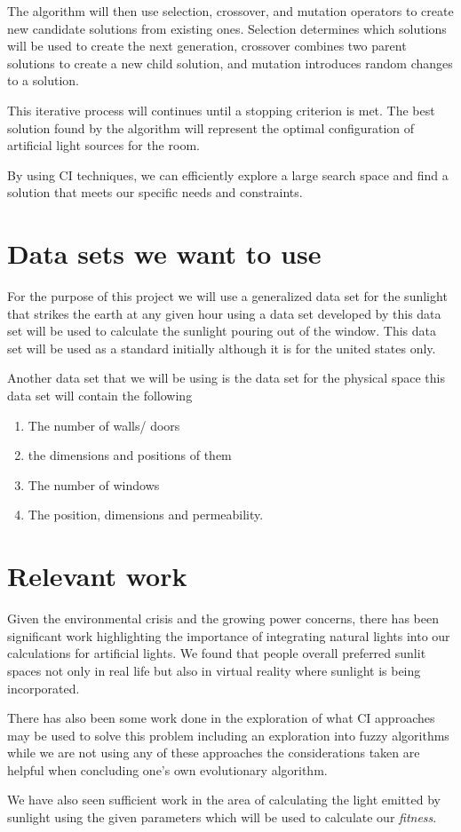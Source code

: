 \documentclass{article}
\begin{document}
The algorithm will then use selection, crossover, and mutation operators to create new candidate solutions from existing ones. Selection determines which solutions will be used to create the next generation, crossover combines two parent solutions to create a new child solution, and mutation introduces random changes to a solution.

This iterative process will continues until a stopping criterion is met. The best solution found by the algorithm will represent the optimal configuration of artificial light sources for the room.

By using CI techniques, we can efficiently explore a large search space and find a solution that meets our specific needs and constraints.


\section{Data sets we want to use}

For the purpose of this project we will use a generalized data set for the sunlight that strikes the earth at any given hour using a data set developed by \cite{perez_ineichen_seals_michalsky_stewart_1990} this data set will be used to calculate the sunlight pouring out of the window. This data set will be used as a standard initially although it is for the united states only. 

Another data set that we will be using is the data set for the physical space this data set will contain the following 

\begin{enumerate} 
    \item The number of walls/ doors 
    \item the dimensions and positions of them 
    \item The number of windows 
    \item The position, dimensions and permeability.
\end{enumerate}

\section{Relevant work}

Given the environmental crisis and the growing power concerns, there has been significant work highlighting the importance of integrating natural lights into our calculations for artificial lights. We found that people overall preferred sunlit spaces not only in real life but also in virtual reality where sunlight is being incorporated. \cite{hegazy_ichiriyama_yasufuku_abe_2021} \cite{galasiu_veitch_2006}

There has also been some work done in the exploration of what CI approaches may be used to solve this problem including an exploration into fuzzy algorithms while we are not using any of these approaches the considerations taken are helpful when concluding one's own evolutionary algorithm. \cite{kurian_aithal_bhat_george_2008}

We have also seen sufficient work in the area of calculating the light emitted by sunlight using the given parameters which will be used to calculate our \textit{fitness}. \cite{solar}

\printbibliography
\end{document}
